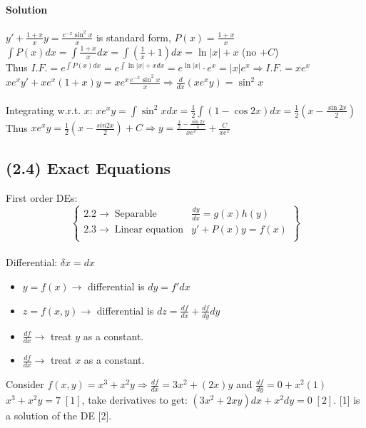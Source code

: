 \documentclass{article}
\begin{document}
\paragraph{Solution} $y'+\frac{1+x}{x}y=\frac{e^{-x}\sin^2x}{x}$ is standard form, $P(x)=\frac{1+x}{x}$
\\$\int\!P(x)dx=\int\frac{1+x}{x}dx=\int\left(\frac{1}{x}+1\right)dx=\ln{|x|}+x$ (no $+C$)
\\Thus $I.F.=e^{\int\!P(x)dx}=e^{\int \ln{|x|}+xdx}=e^{\ln{|x|}}\cdot e^x=|x|e^x\Rightarrow I.F.=xe^x$
\\$xe^xy'+xe^x(1+x)y=xe^x\frac{e^{-x}\sin^2x}{x}\Rightarrow\frac{d}{dx}(xe^xy)=\sin^2x$
\\\\Integrating w.r.t. $x$: $xe^xy=\int\sin^2xdx=\frac{1}{2}\int (1-\cos 2x)dx=\frac{1}{2}\left(x-\frac{\sin 2x}{2}\right)$
\\Thus $xe^xy=\frac{1}{2}\left(x-\frac{sin2x}{2}\right)+C\Rightarrow y=\frac{\frac{x}{2}-\frac{\sin 2x}{4}}{xe^x}+\frac{C}{xe^x}$

\newpage
\subsection{(2.4) Exact Equations}
First order DEs:
\begin{equation}
    \left\{
        \begin{array}{lr}
            2.2 \rightarrow\;\text{Separable} & \frac{dy}{dx}=g(x)h(y)\\
            2.3 \rightarrow\;\text{Linear equation} & y'+P(x)y=f(x)\\
        \end{array}
    \right\}
\end{equation}
\\Differential: $\delta x=dx$
\begin{itemize}
    \itemsep 0em
    \item $y=f(x)\rightarrow$ differential is $dy=f'dx$
    \item $z=f(x,y)\rightarrow$ differential is $dz=\frac{df}{dx}+\frac{df}{dy}dy$
    \item $\frac{df}{dx}\rightarrow$ treat $y$ as a constant.
    \item $\frac{df}{dx}\rightarrow$ treat $x$ as a constant.
\end{itemize}

Consider $f(x,y)=x^3+x^2y\Rightarrow \frac{df}{dx}=3x^2+(2x)y$ and $\frac{df}{dy}=0+x^2(1)$
\\$x^3+x^2y=7\;[1]$, take derivatives to get: $(3x^2+2xy)dx+x^2dy=0 \;[2]$. [1] is a solution of the DE [2].
\end{document}
